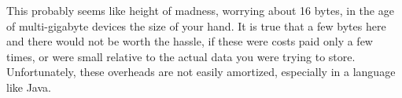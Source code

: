 This probably seems like height of madness, worrying about 16 bytes, in the age
of multi-gigabyte devices the size of your hand. It is true that a few bytes
here and there would not be worth the hassle, if these were costs paid only a
few times, or were small relative to the actual data you were trying to store.
Unfortunately, these overheads are not easily amortized, especially in a
language like Java.

